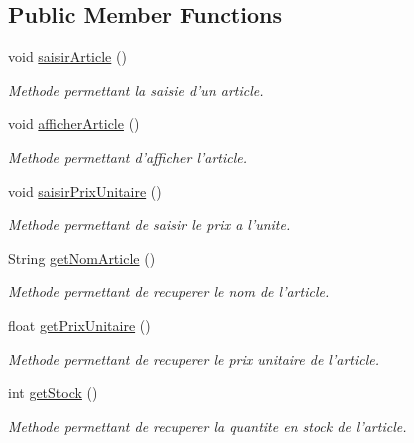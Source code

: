 \subsection*{Public Member Functions}
\begin{DoxyCompactItemize}
\item 
void \hyperlink{classgestion_commande_1_1_article_a9cbf8063f8e987a49d420ada8232cdfd}{saisir\-Article} ()
\begin{DoxyCompactList}\small\item\em Methode permettant la saisie d'un article. \end{DoxyCompactList}\item 
void \hyperlink{classgestion_commande_1_1_article_a3a5a28348928a6b88b337f46a88026e1}{afficher\-Article} ()
\begin{DoxyCompactList}\small\item\em Methode permettant d'afficher l'article. \end{DoxyCompactList}\item 
void \hyperlink{classgestion_commande_1_1_article_aba22b733dd82931721613a0e4338ab9f}{saisir\-Prix\-Unitaire} ()
\begin{DoxyCompactList}\small\item\em Methode permettant de saisir le prix a l'unite. \end{DoxyCompactList}\item 
String \hyperlink{classgestion_commande_1_1_article_a6206b8fb5eb14b54eefb9cd48ed50ac1}{get\-Nom\-Article} ()
\begin{DoxyCompactList}\small\item\em Methode permettant de recuperer le nom de l'article. \end{DoxyCompactList}\item 
float \hyperlink{classgestion_commande_1_1_article_a67b9ca3be955dd04c9aa3707b65b43c7}{get\-Prix\-Unitaire} ()
\begin{DoxyCompactList}\small\item\em Methode permettant de recuperer le prix unitaire de l'article. \end{DoxyCompactList}\item 
int \hyperlink{classgestion_commande_1_1_article_a45aef0c035bb11c4be39787f2c9089cd}{get\-Stock} ()
\begin{DoxyCompactList}\small\item\em Methode permettant de recuperer la quantite en stock de l'article. \end{DoxyCompactList}\end{DoxyCompactItemize}


